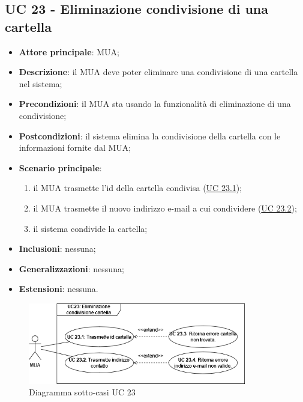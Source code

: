 \subsection{UC 23 - Eliminazione condivisione di una cartella} \label{sec:UC23}

    \begin{itemize}
        \item \textbf{Attore principale}: MUA;
        \item \textbf{Descrizione}: il MUA deve poter eliminare una condivisione di una cartella nel sistema;
        \item \textbf{Precondizioni}: il MUA sta usando la funzionalità di eliminazione di una condivisione;
        \item \textbf{Postcondizioni}: il sistema elimina la condivisione della cartella con le informazioni fornite dal MUA;
        \item \textbf{Scenario principale}:
            \begin{enumerate}
                \item il MUA trasmette l'id della cartella condivisa (\hyperref[sec:UC23.1]{UC 23.1});
                \item il MUA trasmette il nuovo indirizzo e-mail a cui condividere (\hyperref[sec:UC23.2]{UC 23.2});
                \item il sistema condivide la cartella;
            \end{enumerate}
        \item \textbf{Inclusioni}: nessuna;
        \item \textbf{Generalizzazioni}: nessuna;
        \item \textbf{Estensioni}: nessuna.
    \end{itemize}

    \begin{figure}[H]
        \includegraphics[width=0.85\textwidth]{sections/uc_imgs/UC23.png}
        \centering
        \caption{Diagramma sotto-casi UC 23}
    \end{figure}

